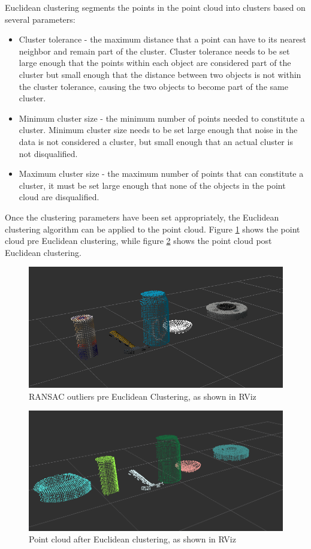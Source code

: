 \documentclass{article}
\begin{document}
Euclidean clustering segments the points in the point cloud into clusters based on several parameters:
\begin{itemize}
    \item Cluster tolerance - the maximum distance that a point can have to its nearest neighbor and remain part of the cluster. Cluster tolerance needs to be set large enough that the points within each object are considered part of the cluster but small enough that the distance between two objects is not within the cluster tolerance, causing the two objects to become part of the same cluster.
    \item Minimum cluster size - the minimum number of points needed to constitute a cluster. Minimum cluster size needs to be set large enough that noise in the data is not considered a cluster, but small enough that an actual cluster is not disqualified. 
    \item Maximum cluster size - the maximum number of points that can constitute a cluster, it must be set large enough that none of the objects in the point cloud are disqualified.

\end{itemize}

Once the clustering parameters have been set appropriately, the Euclidean clustering algorithm can be applied to the point cloud. Figure \ref{fig:preec} shows the point cloud pre Euclidean clustering, while figure \ref{fig:ec} shows the point cloud post Euclidean clustering.

\begin{figure}[H]
    \includegraphics[width=\linewidth]{preec.png}
    \caption{RANSAC outliers pre Euclidean Clustering, as shown in RViz}
    \label{fig:preec}
\end{figure}

\begin{figure}[H]
    \includegraphics[width=\linewidth]{ec.png}
    \caption{Point cloud after Euclidean clustering, as shown in RViz}
    \label{fig:ec}
\end{figure}
\end{document}
